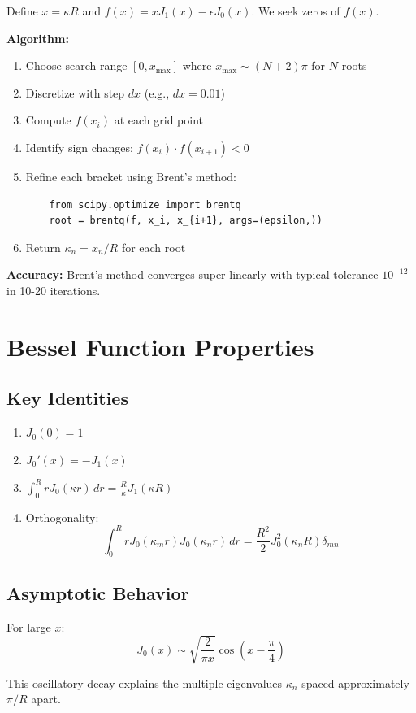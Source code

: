 \documentclass[12pt,a4paper]{article}
\begin{document}
Define $x = \kappa R$ and $f(x) = x J_1(x) - \epsilon J_0(x)$. We seek zeros of $f(x)$.

\textbf{Algorithm:}
\begin{enumerate}
    \item Choose search range $[0, x_{\max}]$ where $x_{\max} \sim (N+2)\pi$ for $N$ roots
    \item Discretize with step $dx$ (e.g., $dx = 0.01$)
    \item Compute $f(x_i)$ at each grid point
    \item Identify sign changes: $f(x_i) \cdot f(x_{i+1}) < 0$
    \item Refine each bracket using Brent's method:
    \begin{verbatim}
    from scipy.optimize import brentq
    root = brentq(f, x_i, x_{i+1}, args=(epsilon,))
    \end{verbatim}
    \item Return $\kappa_n = x_n / R$ for each root
\end{enumerate}

\textbf{Accuracy:} Brent's method converges super-linearly with typical tolerance $10^{-12}$ in 10-20 iterations.

\section{Bessel Function Properties}

\subsection{Key Identities}

\begin{enumerate}
    \item $J_0(0) = 1$
    \item $J_0'(x) = -J_1(x)$
    \item $\int_0^R r J_0(\kappa r) \, dr = \frac{R}{\kappa} J_1(\kappa R)$
    \item Orthogonality:
    \begin{equation}
    \int_0^R r J_0(\kappa_m r) J_0(\kappa_n r) \, dr = \frac{R^2}{2} J_0^2(\kappa_n R) \delta_{mn}
    \end{equation}
\end{enumerate}

\subsection{Asymptotic Behavior}

For large $x$:
\begin{equation}
J_0(x) \sim \sqrt{\frac{2}{\pi x}} \cos\left(x - \frac{\pi}{4}\right)
\end{equation}

This oscillatory decay explains the multiple eigenvalues $\kappa_n$ spaced approximately $\pi/R$ apart.
\end{document}
